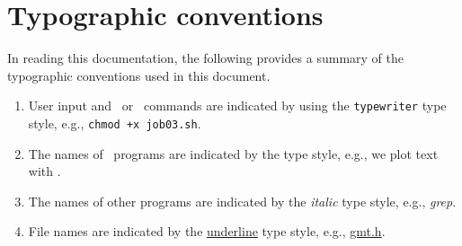
\chapter*{Typographic conventions}

In reading this documentation, the following provides a summary of
the typographic conventions used in this document.

\begin{enumerate}

\item User input and \GMT\ or \UNIX\ commands are indicated by
using the \texttt{typewriter} type style, e.g., \texttt{chmod +x job03.sh}.

\item The names of \GMT\ programs are indicated by the
 type style, e.g., we plot text with .

\item The names of other programs are indicated by the
{\textit{italic} type style, e.g., \textit{grep}.}

\item File names are indicated by the \underline{underline}
type style, e.g., \underline{gmt.h}.

\end{enumerate}
